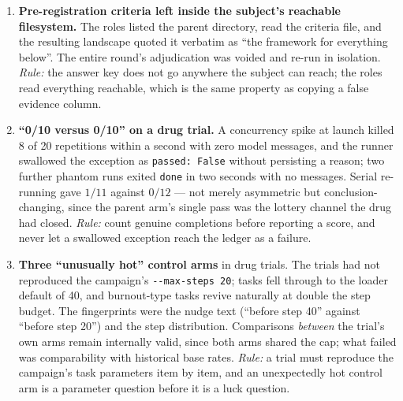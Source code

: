 \begin{enumerate}[leftmargin=2.2em]
  \item \textbf{Pre-registration criteria left inside the subject's
        reachable filesystem.} The roles listed the parent directory, read
        the criteria file, and the resulting landscape quoted it verbatim
        as ``the framework for everything below''. The entire round's
        adjudication was voided and re-run in isolation. \emph{Rule:} the
        answer key does not go anywhere the subject can reach; the roles
        read everything reachable, which is the same property as copying a
        false evidence column.

  \item \textbf{``0/10 versus 0/10'' on a drug trial.} A concurrency spike
        at launch killed 8 of 20 repetitions within a second with zero
        model messages, and the runner swallowed the exception as
        \texttt{passed:\ False} without persisting a reason; two further
        phantom runs exited \texttt{done} in two seconds with no messages.
        Serial re-running gave $1/11$ against $0/12$ --- not merely
        asymmetric but conclusion-changing, since the parent arm's single
        pass was the lottery channel the drug had closed. \emph{Rule:}
        count genuine completions before reporting a score, and never let a
        swallowed exception reach the ledger as a failure.

  \item \textbf{Three ``unusually hot'' control arms} in drug trials. The
        trials had not reproduced the campaign's \texttt{-{}-max-steps 20};
        tasks fell through to the loader default of 40, and burnout-type
        tasks revive naturally at double the step budget. The fingerprints
        were the nudge text (``before step 40'' against ``before step
        20'') and the step distribution. Comparisons \emph{between} the
        trial's own arms remain internally valid, since both arms shared
        the cap; what failed was comparability with historical base rates.
        \emph{Rule:} a trial must reproduce the campaign's task parameters
        item by item, and an unexpectedly hot control arm is a parameter
        question before it is a luck question.

\end{enumerate}
